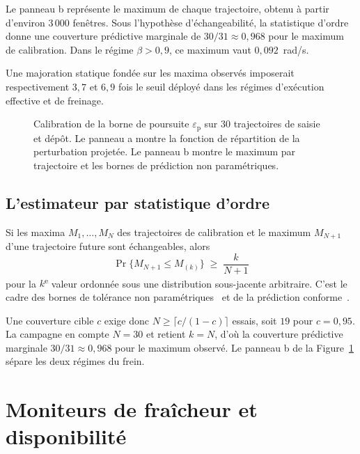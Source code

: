 Le panneau b représente le maximum de chaque trajectoire, obtenu à partir d'environ $3\,000$ fenêtres. Sous l'hypothèse d'échangeabilité, la statistique d'ordre donne une couverture prédictive marginale de $30/31\approx0{,}968$ pour le maximum de calibration. Dans le régime $\beta>0{,}9$, ce maximum vaut $0{,}092$~rad/s.

Une majoration statique fondée sur les maxima observés imposerait respectivement $3{,}7$ et $6{,}9$ fois le seuil déployé dans les régimes d'exécution effective et de freinage.

\begin{figure}[htpb]
    \centering
    
    \caption[Calibration de la borne de poursuite $\varepsilon_{\mathrm{p}}$]{Calibration de la borne de poursuite $\varepsilon_{\mathrm p}$ sur 30 trajectoires de saisie et dépôt. Le panneau a montre la fonction de répartition de la perturbation projetée. Le panneau b montre le maximum par trajectoire et les bornes de prédiction non paramétriques.}\label{fig:res_epsilon_calibration}
\end{figure}

\subsection*{L'estimateur par statistique d'ordre}

Si les maxima $M_1,\dots,M_N$ des trajectoires de calibration et le maximum $M_{N+1}$ d'une trajectoire future sont échangeables, alors
\begin{equation}\label{eq:stat_ordre}
\Pr\{M_{N+1}\leq M_{(k)}\}\;\geq\;\frac{k}{N+1}
\end{equation}
pour la $k$\textsuperscript{e} valeur ordonnée sous une distribution sous-jacente arbitraire. C'est le cadre des bornes de tolérance non paramétriques~\cite{Wilks1941Tolerance} et de la prédiction conforme~\cite{Vovk2005Algorithmic}.

Une couverture cible $c$ exige donc $N\geq\lceil c/(1-c)\rceil$ essais, soit $19$ pour $c=0{,}95$. La campagne en compte $N=30$ et retient $k=N$, d'où la couverture prédictive marginale $30/31\approx0{,}968$ pour le maximum observé. Le panneau b de la Figure~\ref{fig:res_epsilon_calibration} sépare les deux régimes du frein.

\section*{Moniteurs de fraîcheur et disponibilité}

